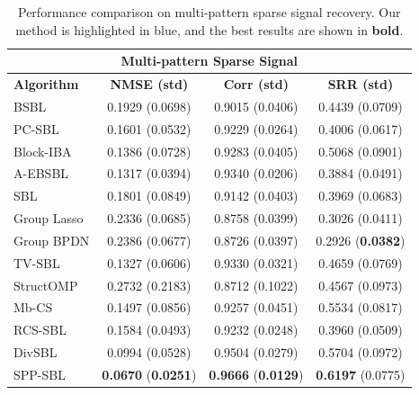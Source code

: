\documentclass[lettersize,journal]{IEEEtran}
\theoremstyle{remark}
\begin{document}
\begin{table}[!t]
	\centering
	\caption{Performance comparison on multi-pattern sparse signal recovery. Our method is highlighted in \colorbox{customblue}{blue}, and the best results are shown in \textbf{bold}.}
	\label{tab:multi_pattern}
	\begin{tabularx}{\linewidth}{lccc}
		\toprule
		\multicolumn{4}{c}{\textbf{Multi-pattern Sparse Signal}}\\
		\midrule
		\textbf{Algorithm} & \textbf{NMSE (std)} & \textbf{Corr (std)} & \textbf{SRR (std)} \\
		\midrule
		BSBL         & 0.1929 (0.0698) & 0.9015 (0.0406) &  0.4439 (0.0709)  \\
		PC-SBL       & 0.1601 (0.0532) & 0.9229 (0.0264) &  0.4006 (0.0617)  \\
		Block-IBA    & 0.1386 (0.0728) & 0.9283 (0.0405) &  0.5068 (0.0901) \\
		A-EBSBL      & 0.1317 (0.0394) & 0.9340 (0.0206) &  0.3884 (0.0491)  \\
		SBL          & 0.1801 (0.0849) & 0.9142 (0.0403) &  0.3969 (0.0683)  \\
		Group Lasso  & 0.2336 (0.0685) & 0.8758 (0.0399) &  0.3026 (0.0411)  \\
		Group BPDN   & 0.2386 (0.0677) & 0.8726 (0.0397) &  0.2926 (\textbf{0.0382})  \\
		TV-SBL    & 0.1327 (0.0606) & 0.9330 (0.0321) &  0.4659 (0.0769)  \\
		StructOMP    & 0.2732 (0.2183) & 0.8712 (0.1022) &  0.4567 (0.0973)  \\
		Mb-CS  &  0.1497 (0.0856) & 0.9257 (0.0451) & 0.5534 (0.0817)\\
		RCS-SBL  &  0.1584 (0.0493) & 0.9232 (0.0248) & 0.3960 (0.0509)\\
		DivSBL       & 0.0994 (0.0528) & 0.9504 (0.0279) &  0.5704 (0.0972)  \\
		\rowcolor{customblue}
		SPP-SBL      & \textbf{0.0670} (\textbf{0.0251}) & \textbf{0.9666} (\textbf{0.0129}) & \textbf{0.6197} (0.0775)  \\
		\bottomrule
	\end{tabularx}
\end{table}
\end{document}
